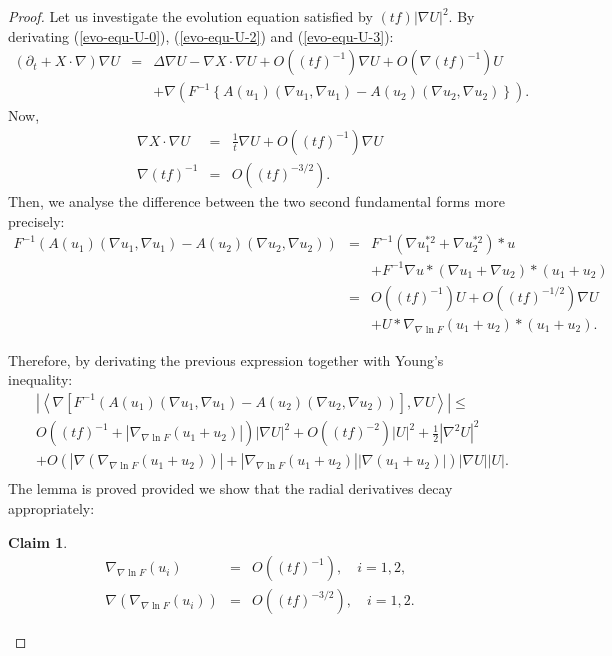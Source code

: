 \documentclass[a4paper,11pt,reqno]{amsart}
\newtheorem{claim}{Claim}
\begin{document}
\begin{proof}
Let us investigate the evolution equation satisfied by $(tf)|\nabla U|^2$. By derivating (\ref{evo-equ-U-0}), (\ref{evo-equ-U-2}) and (\ref{evo-equ-U-3}):
\begin{eqnarray}
\left(\partial_t+X\cdot\nabla \right)\nabla U&=&\Delta\nabla U-\nabla X\cdot\nabla U+\textit{O}\left((tf)^{-1}\right)\nabla U+\textit{O}\left(\nabla (tf)^{-1}\right)U\label{evo-equ-nabla-U-1}\\
&&+\nabla\left(F^{-1}\left\{A(u_1)(\nabla u_1,\nabla u_1)-A(u_2)(\nabla u_2,\nabla u_2)\right\}\right).\label{evo-equ-nabla-U-2}
\end{eqnarray}
Now,
\begin{eqnarray}
\nabla X\cdot \nabla U&=&\frac{1}{t}\nabla U+\textit{O}\left((tf)^{-1}\right)\nabla U\label{est-vec-field-X-1}\\
\nabla (tf)^{-1}&=&\textit{O}\left( (tf)^{-3/2}\right).\label{est-vec-field-X-2}
\end{eqnarray}
Then, we analyse the difference between the two second fundamental forms more precisely:
\begin{eqnarray*}
F^{-1}\left(A(u_1)(\nabla u_1,\nabla u_1)-A(u_2)(\nabla u_2,\nabla u_2)\right)&=&F^{-1}(\nabla u_1^{\ast2}+\nabla u_2^{\ast2})\ast u\\
&&+F^{-1}\nabla u\ast (\nabla u_1+\nabla u_2)\ast (u_1+u_2)\\
&=&\textit{O}((tf)^{-1})U +\textit{O}((tf)^{-1/2})\nabla U\\
&&+U\ast \nabla_{\nabla \ln F}(u_1+u_2)\ast (u_1+u_2).
\end{eqnarray*}

Therefore, by derivating the previous expression together with Young's inequality:
\begin{eqnarray*}
&&\left|\left<\nabla\left[F^{-1}\left(A(u_1)(\nabla u_1,\nabla u_1)-A(u_2)(\nabla u_2,\nabla u_2)\right)\right],\nabla U\right>\right|\leq\\
&&\textit{O}\left((tf)^{-1}+|\nabla_{\nabla \ln F}(u_1+u_2)|\right)|\nabla U|^2+\textit{O}\left((tf)^{-2}\right)|U|^2+\frac{1}{2}|\nabla^2U|^2\\
&&+\textit{O}\left(\left|\nabla(\nabla_{\nabla \ln F}(u_1+u_2))\right|+\left|\nabla_{\nabla \ln F}(u_1+u_2)\right||\nabla(u_1+u_2)|\right)|\nabla U||U|.\\
\end{eqnarray*}
The lemma is proved provided we show that the radial derivatives decay appropriately:
\begin{claim}\label{rad-der-ext-claim}
\begin{eqnarray*}
\nabla_{\nabla \ln F}(u_i)&=&\textit{O}((tf)^{-1}),\quad i=1,2,\\
\nabla(\nabla_{\nabla \ln F}(u_i))&=&\textit{O}((tf)^{-3/2}),\quad i=1,2.
\end{eqnarray*}



\end{claim}
\end{proof}
\end{document}
